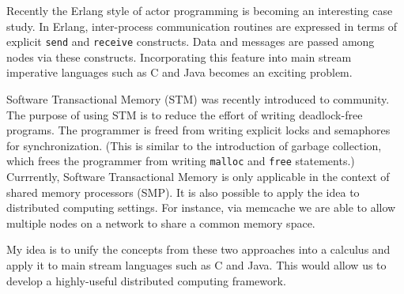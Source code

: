 \documentclass[12pt]{article}
\theoremstyle{plain} \numberwithin{equation}{section}
\theoremstyle{definition}
\newcommand{\comment}[1]{}
\begin{document}
Recently the Erlang \cite{erlang} style of actor programming is becoming
an interesting case study. In Erlang, inter-process communication
routines are expressed in terms of explicit {\tt send} and {\tt receive}
constructs. Data and messages are passed among nodes via these
constructs. Incorporating this feature into main stream imperative
languages such as C and Java becomes an exciting problem. 

Software Transactional Memory (STM) \cite{stm} was recently introduced to
community. The purpose of using STM is to reduce the effort of 
writing deadlock-free programs. The programmer is freed from 
writing explicit locks and semaphores for synchronization. (This is
similar to the introduction of garbage collection, which 
frees the programmer from writing {\tt malloc} and {\tt free} statements.) Currrently, Software Transactional Memory is only applicable in the context of 
shared memory processors (SMP). It is also possible to apply the
idea to distributed computing settings. For instance, via memcache
we are able to allow multiple nodes on a network to share a common
memory space.  

My idea is to unify the concepts from these two approaches into a
calculus and apply it to main stream languages such as C and Java. 
This would allow us to develop a highly-useful distributed computing framework.
\comment{
Recently, there have been some work \cite{cchr} which unifies the ideas of the 
above two projects. Via a notion of Concurrent Constraint Handling
Rules, it is possible to describe these two features in one single 
calculus. Therefore, there is ample of space we can explore the hybrid
approach of the two.
}






\newpage


\end{document}
